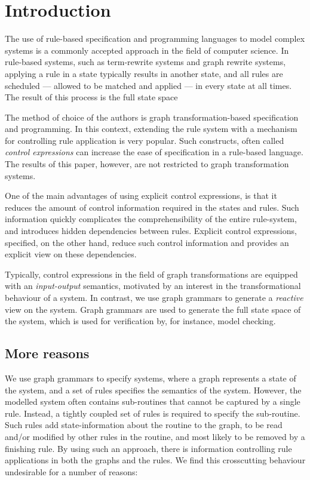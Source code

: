 \section{Introduction}\label{sec:introduction}
The use of rule-based specification and programming languages to model complex systems is a commonly accepted approach in the field of computer science. In rule-based systems, such as term-rewrite systems and graph rewrite systems, applying a rule in a state typically results in another state, and all rules are scheduled --- allowed to be matched and applied ---  in every state at all times. The result of this process is the full state space 


The method of choice of the authors is graph transformation-based specification and programming. In this context, extending the rule system with a mechanism for controlling rule application is very popular. Such constructs, often called \emph{control expressions} can increase the ease of specification in a rule-based language. The results of this paper, however, are not restricted to graph transformation systems.

One of the main advantages of using explicit control expressions, is that it reduces the amount of control information required in the states and rules. Such information quickly complicates the comprehensibility of the entire rule-system, and introduces hidden dependencies between rules. Explicit control expressions,  specified, on the other hand, reduce such control information and provides an explicit view on these dependencies.

Typically, control expressions in the field of graph transformations are equipped with an \emph{input-output} semantics, motivated by an interest in the transformational behaviour of a system. In contrast, we use graph grammars to generate a \emph{reactive} view on the system. Graph grammars are used to generate the full state space of the system, which is used for verification by, for instance, model checking.

\iffull %

\subsection{More reasons} 
We use graph grammars to specify systems, where a graph represents a state of the system, and a set of rules specifies the semantics of the system. However, the modelled system often contains sub-routines that cannot be captured by a single rule. Instead, a tightly coupled set of rules is required to specify the sub-routine. Such rules add state-information about the routine to the graph, to be read and/or modified by other rules in the routine, and most likely to be removed by a finishing rule. By using such an approach, there is information controlling rule applications in both the graphs and the rules. We find this crosscutting behaviour undesirable for a number of reasons: 

